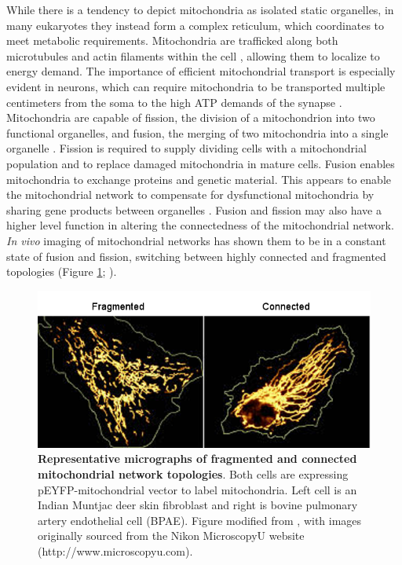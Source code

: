 \documentclass[12pt,twoside]{reedthesis}
\begin{document}
While there is a tendency to depict mitochondria as isolated static organelles, in many eukaryotes they instead form a complex reticulum, which coordinates to meet metabolic requirements.
Mitochondria are trafficked along both microtubules and actin filaments within the cell \citep{hollenbeck_axonal_2005}, allowing them to localize to energy demand.
The importance of efficient mitochondrial transport is especially evident in neurons, which can require mitochondria to be transported multiple centimeters from the soma to the high ATP demands of the synapse \citep{schwarz_mitochondrial_2013}.
Mitochondria are capable of fission, the division of a mitochondrion into two functional organelles, and fusion, the merging of two mitochondria into a single organelle \citep{youle_mitochondrial_2012}.
Fission is required to supply dividing cells with a mitochondrial population and to replace damaged mitochondria in mature cells.
Fusion enables mitochondria to exchange proteins and genetic material.
This appears to enable the mitochondrial network to compensate for dysfunctional mitochondria by sharing gene products between organelles \citep{nakada_inter-mitochondrial_2001}.
Fusion and fission may also have a higher level function in altering the connectedness of the mitochondrial network. 
\textit{In vivo} imaging of mitochondrial networks has shown them to be in a constant state of fusion and fission, switching between highly connected and fragmented topologies (Figure \ref{network_topology}; \citealp{jakobs_photoconversion_2003, rafelski_mitochondrial_2013}).

\begin{figure}[h]
    \begin{center}
        \includegraphics[scale=0.7]{../figures/network_topology.png}
    \end{center}
    \caption[Representative micrographs of fragmented and connected mitochondrial network topologies]{\textbf{Representative micrographs of fragmented and connected mitochondrial network topologies}. Both cells are expressing pEYFP-mitochondrial vector to label mitochondria. Left cell is an Indian Muntjac deer skin fibroblast and right is bovine pulmonary artery endothelial cell (BPAE). Figure modified from \citealp{rafelski_mitochondrial_2013}, with images originally sourced from the Nikon MicroscopyU website (http://www.microscopyu.com).}
    \label{network_topology}
\end{figure}
\end{document}
